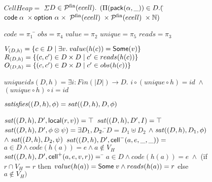 \documentclass[natbib]{sigplanconf}
\begin{document}
\begin{figure}
{\small
\begin{specification}
$CellHeap =$ \nextline
\;\;$\Sigma$\=$ D \in \mathcal{P}^{\mathrm{fin}}({ecell}).$ \nextline
               \>$(\Pi (\mbox{\textsf{{pack}}}({\alpha}, {\_})) \in D. 
  ($\=${\mbox{\textsf{{code}}}\;{\alpha}} \;\times \mbox{\textsf{{option }}}{\alpha} \;\times$ \nextline
\>  \>${\mathcal{P}^{\mathrm{fin}}({ecell})} \;\times \mathcal{P}^{\mathrm{fin}}({ecell}) \;\times \mathbb{N})$ \nextline[0.5em]
       

$code = \pi_1$ \qquad\qquad\= $obs = \pi_4$ \nextline
$value = \pi_2$            \> $unique = \pi_5$ \nextline
$reads = \pi_3$ 

$V_{(D, h)} = \{{{c \in D}\;|\;{\exists v.\; value(h(c)) = \mbox{\textsf{{Some}}}(v)}}\}$ 
$R_{(D, h)} = \{{{(c,c') \in D \times D}\;|\;{ c' \in reads(h(c)) }}\}$ 
$O_{(D, h)} = \{{{(c,c') \in D \times D}\;|\;{ c' \in obs(h(c)) }}\}$ 

$\mathit{uniqueids}(D,h) = \exists$\=$i : Fin(|D|) \to D.$\nextline
                       \>$i \circ (unique \circ h) = id \; \land$ \nextline
                       \>$(unique \circ h) \circ i = id$ 

$\mathit{satisfies}({(D,h)}, {\phi}) = sat((D,h), D, \phi)$ 

$\mathit{sat}((D,h), D', \mbox{\textsf{{local}}}({r}, {v})) = \top$ 
$\mathit{sat}((D,h), D', I) = \top$ 
$\mathit{sat}((D,h), D', \phi \otimes \psi) = \exists D_1, D_2.\;$\=$D = D_1 \uplus D_2$ \nextline
                                                    \>$\land\; \mathit{sat}((D,h), D_1, \phi)$ \nextline
                                                    \>$\land\; \mathit{sat}((D,h), D_2, \psi)$ 
$sat((D,h), D', \mbox{\textsf{{cell}}}^{-}({a}, {e}, {\_}, {\_})) = $ \nextline
\qquad $a \in D \land code(h(a)) = e \land a \not \in V_H$ 
$sat((D,h), D', \mbox{\textsf{{cell}}}^{+}({a}, {e}, {v}, {r})) = $ \nextline
\qquad\= $a \in D \land code(h(a)) = e \;\land$ \nextline
      \>     (\= if $r \cap V_H = r$ \nextline
      \>     \>then $value(h(a)) = \mbox{\textsf{{Some}}}\;v \land reads(h(a)) = r$ \nextline
      \>     \>else $a \not\in V_H)$


\end{specification}}
\end{figure}
\end{document}
